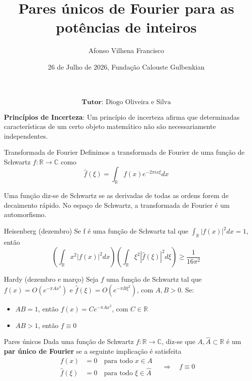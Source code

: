 \documentclass{beamer}
\title{Pares únicos de Fourier para as potências de inteiros}
\author{Afonso Vilhena Francisco}
\date{26 de Julho de 2026, Fundação Calouste Gulbenkian}
\begin{document}
\begin{frame}{}
    \titlepage
    $$\textbf{Tutor: } \text{Diogo Oliveira e Silva}$$

\end{frame}

\begin{frame}{}
    \textbf{Princípios de Incerteza}: Um princípio de incerteza afirma que determinadas características de um certo objeto matemático não são necessariamente independentes.


    \vspace{0.5cm}
    \pause
    \begin{block}{Transformada de Fourier}
        Definimos a transformada de Fourier de uma função de Schwartz $f: \mathbb{R} \rightarrow \mathbb{C}$ como
        $$\hat{f}(\xi)=\int_{\mathbb{R}}f(x)e^{-2\pi i x \xi }dx$$
    \end{block}

    \tiny Uma função diz-se de Schwartz se as derivadas de todas as ordens forem de decaimento rápido.
    No espaço de Schwartz, a transformada de Fourier é um automorfismo.
\end{frame}

\begin{frame}{}
    \begin{block}{Heisenberg (dezembro)}
        Se f é uma função de Schwartz tal que $\int_{\mathbb{R}}|f(x)|^2dx=1$, então
        $$\left( \int_\mathbb{R}x^2|f(x)|^2dx \right) \left(  \int_\mathbb{R}\xi^2|\hat{f}(\xi)|^2d\xi \right) \geq \frac{1}{16\pi^2}$$
    \end{block}
\vspace{0.8cm}
\pause
    \begin{block}{Hardy (dezembro e março)}
        Seja $f$ uma função de Schwartz tal que $f(x)=O(e^{-\pi Ax^2 })$ e $\hat{f}(\xi)=O(e^{-\pi B \xi^2})$, com $A,B >0$.
        Se:
        \begin{itemize}
            \item $AB=1$, então $f(x)=Ce^{-\pi Ax^2}$, com $C \in \mathbb{R}$
            \item $AB>1$, então $f \equiv 0$
        \end{itemize}
    \end{block}
\end{frame}

\begin{frame}
    \begin{block}{Pares únicos}
         Dada uma função de Schwartz $f: \mathbb{R} \rightarrow \mathbb{C}$, diz-se que  $A, \widehat{A} \subset \mathbb{R}$ é um \textbf{par único de Fourier} se a seguinte implicação é satisfeita 
    \[
    \begin{aligned}
        f(x) &= 0 \quad \text{para todo } x \in A\\
        \hat{f}(\xi) &= 0 \quad \text{para todo } \xi \in \widehat{A}
    \end{aligned}
    \quad \Rightarrow \quad
    f \equiv 0
    \]
    \end{block}

\end{frame}
\end{document}
